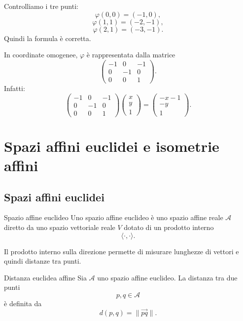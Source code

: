 \documentclass[a4paper]{article}
\begin{document}
\begin{snippetsolution}{}
    Controlliamo i tre punti:
    \[
        \varphi(0,0)=(-1,0),
    \]
    \[
        \varphi(1,1)=(-2,-1),
    \]
    \[
        \varphi(2,1)=(-3,-1).
    \]
    Quindi la formula è corretta.

    In coordinate omogenee, \(\varphi\) è rappresentata dalla matrice
    \[
        \begin{pmatrix}
            -1 & 0 & -1\\
            0 & -1 & 0\\
            0 & 0 & 1
        \end{pmatrix}.
    \]
    Infatti:
    \[
        \begin{pmatrix}
            -1 & 0 & -1\\
            0 & -1 & 0\\
            0 & 0 & 1
        \end{pmatrix}
        \begin{pmatrix}
            x\\
            y\\
            1
        \end{pmatrix}
        =
        \begin{pmatrix}
            -x-1\\
            -y\\
            1
        \end{pmatrix}.
    \]
\end{snippetsolution}

\section{Spazi affini euclidei e isometrie affini}

\subsection{Spazi affini euclidei}

\begin{snippetdefinition}{Spazio affine euclideo}
    Uno spazio affine euclideo è uno spazio affine reale \(\mathcal{A}\) diretto da uno spazio vettoriale reale \(V\) dotato di un prodotto interno
    \[
        \langle\cdot,\cdot\rangle.
    \]
\end{snippetdefinition}

Il prodotto interno sulla direzione permette di misurare lunghezze di vettori e quindi distanze tra punti.

\begin{snippetdefinition}{Distanza euclidea affine}
    Sia \(\mathcal{A}\) uno spazio affine euclideo. La distanza tra due punti
    \[
        p,q\in\mathcal{A}
    \]
    è definita da
    \[
        d(p,q)=\|\overrightarrow{pq}\|.
    \]
\end{snippetdefinition}
\end{document}
